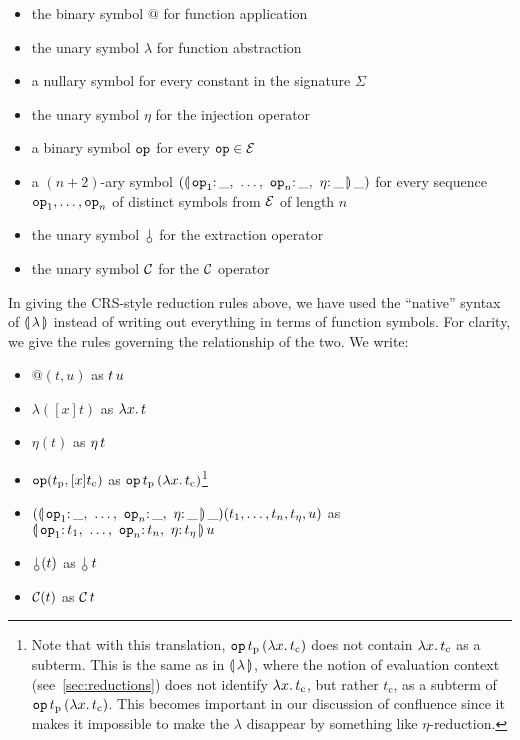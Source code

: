 \begin{itemize}
\item the binary symbol $@$ for function application
\item the unary symbol $\lambda$ for function abstraction
\item a nullary symbol for every constant in the signature $\Sigma$
\item the unary symbol $\eta$ for the injection operator
\item a binary symbol $\mathtt{op}$ for every $\mathtt{op} \in \mathcal{E}$
\item a $(n+2)$-ary symbol
  $(\ap{\banana{\onto{\op{op}_1}{\_},\ \ldots,\ \onto{\op{op}_n}{\_},\ \onto{\eta}{\_}}}{\_})$
  for every sequence $\mathtt{op}_1,\ldots,\mathtt{op}_n$ of distinct symbols from
  $\mathcal{E}$ of length $n$
\item the unary symbol $\cherry$ for the extraction operator
\item the unary symbol $\mathcal{C}$ for the $\mathcal{C}$ operator
\end{itemize}

In giving the CRS-style reduction rules above, we have used the ``native''
syntax of $\llparenthesis \, \lambda \, \rrparenthesis$ instead of writing out everything in terms of
function symbols. For clarity, we give the rules governing the relationship
of the two. We write:

\begin{itemize}
\item $@(t,u)$ as $t\,u$
\item $\lambda([x]t)$ as $\lambda x.\, t$
\item $\eta(t)$ as $\eta\,t$
\item $\mathtt{op}(t_{\mathrm{p}},[x]t_{\mathrm{c}})$ as
  $\mathtt{op}\,t_{\mathrm{p}}\,(\lambda x.\, t_{\mathrm{c}})$\footnote{Note
    that with this translation,
    $\mathtt{op}\,t_{\mathrm{p}}\,(\lambda x.\, t_{\mathrm{c}})$ does not
    contain $\lambda x.\, t_{\mathrm{c}}$ as a subterm. This is the same as in
    $\llparenthesis \, \lambda \, \rrparenthesis$, where the notion of evaluation context
    (see~\ref{sec:reductions}) does not identify $\lambda x.\, t_{\mathrm{c}}$,
    but rather $t_{\mathrm{c}}$, as a subterm of
    $\mathtt{op}\,t_{\mathrm{p}}\,(\lambda x.\, t_{\mathrm{c}})$. This
    becomes important in our discussion of confluence since it makes it
    impossible to make the $\lambda$ disappear by something like
    $\eta$-reduction.}
\item
  $(\ap{\banana{\onto{\op{op}_1}{\_},\ \ldots,\ \onto{\op{op}_n}{\_},\ \onto{\eta}{\_}}}{\_})(t_1,\ldots,t_n,t_\eta,u)$
  as $\ap{\banana{\onto{\op{op}_1}{t_1},\ \ldots,\ \onto{\op{op}_n}{t_n},\ \onto{\eta}{t_\eta}}}{u}$
\item $\cherry(t)$ as $\ap{\cherry}{t}$
\item $\mathcal{C}(t)$ as $\mathcal{C}\,t$
\end{itemize}

